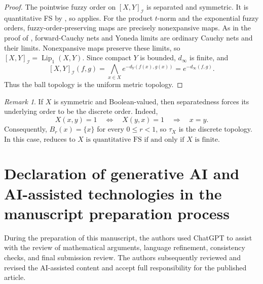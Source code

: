 \documentclass[preprint,3p,times]{elsarticle}
\theoremstyle{definition}
\theoremstyle{remark}
\newtheorem{remark}[remark]{Remark}
\newcommand{\I}{\mathcal{I}}
\numberwithin{equation}{section}
\begin{document}
\begin{proof}
The pointwise fuzzy order on \([X,Y]_{\I}\) is separated and symmetric. It is quantitative FS by , so  applies.
For the product \(t\)-norm and the exponential fuzzy orders, fuzzy-order-preserving maps are precisely nonexpansive maps. As in the proof of , forward-Cauchy nets and Yoneda limits are ordinary Cauchy nets and their limits. Nonexpansive maps preserve these limits, so \([X,Y]_{\I}=\operatorname{Lip}_1(X,Y)\). Since compact \(Y\) is bounded, \(d_\infty\) is finite, and
\[
 [X,Y]_{\I}(f,g)=\bigwedge_{x\in X}e^{-d_Y(f(x),g(x))}
               =e^{-d_\infty(f,g)}.
\]
Thus the ball topology is the uniform metric topology.
\end{proof}


\begin{remark}
If \(X\) is symmetric and Boolean-valued, then separatedness forces its underlying order to be the discrete order. Indeed,
\[
X(x,y)=1
\quad\Longleftrightarrow\quad
X(y,x)=1
\quad\Longrightarrow\quad x=y.
\]
Consequently, \(B_r(x)=\{x\}\) for every \(0\leq r<1\), so \(\tau_X\) is the discrete topology. In this case,  reduces to
\(
X\text{ is quantitative FS}
\text{ if and only if }
X\text{ is finite}.
\)
\end{remark}



\section*{Declaration of generative AI and AI-assisted technologies in the manuscript preparation process}

During the preparation of this manuscript, the authors used ChatGPT to assist with the review of mathematical
arguments, language refinement, consistency checks, and final submission review. The authors subsequently reviewed and revised the AI-assisted content and accept full responsibility for the published article.
\end{document}
